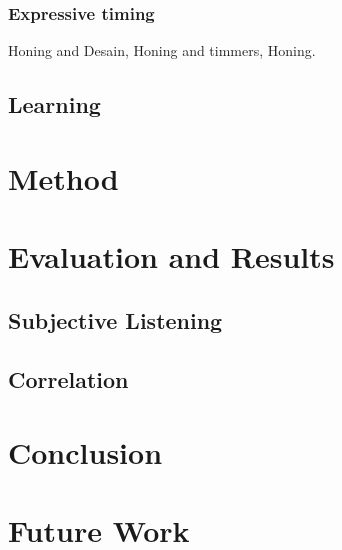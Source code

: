 \documentclass[a4paper,10pt]{article}
\begin{document}
\subsubsection{Expressive timing} Honing and Desain, Honing and timmers, Honing.
\subsection{Learning}


\section{Method}
\section{Evaluation and Results}
\subsection{Subjective Listening}
\subsection{Correlation}
\section{Conclusion}
\section{Future Work}

  
 
 
\end{document}
